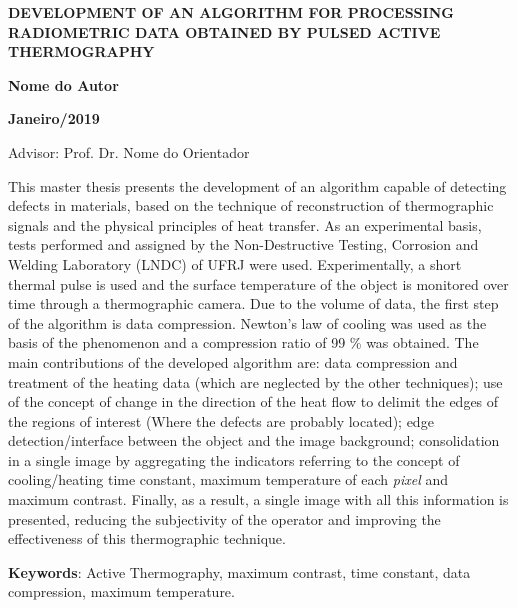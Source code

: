 \documentclass[
	    12pt,				%
	    openright,			%
	    oneside,			%
	    a4paper,			%
	english,			%
	french,				%
	spanish,			%
	brazil,				%
	]{abntex2}
\begin{document}
    \begin{center}
        \par
        \vspace*{0.2cm}
        \par
        \textbf{DEVELOPMENT OF AN ALGORITHM FOR PROCESSING RADIOMETRIC DATA OBTAINED BY PULSED ACTIVE THERMOGRAPHY}
        \par
        \vspace*{0.2cm}
        \par
        \textbf{Nome do Autor}
        \vspace*{0.2cm}
        \par
        \textbf{Janeiro/2019}
        \vspace*{0.2cm}
    \end{center}
    \par
    \noindent Advisor: Prof. Dr. Nome do Orientador
    \par
    \vspace*{0.2cm}
    \par
    This master thesis presents the development of an algorithm capable of detecting defects in materials, based on the technique of reconstruction of thermographic signals and the physical principles of heat transfer. As an experimental basis, tests performed and assigned by the Non-Destructive Testing, Corrosion and Welding Laboratory (LNDC) of UFRJ were used. Experimentally, a short thermal pulse is used and the surface temperature of the object is monitored over time through a thermographic camera. Due to the volume of data, the first step of the algorithm is data compression. Newton's law of cooling was used as the basis of the phenomenon and a compression ratio of 99 \% was obtained. The main contributions of the developed algorithm are: data compression and treatment of the heating data (which are neglected by the other techniques); use of the concept of change in the direction of the heat flow to delimit the edges of the regions of interest (Where the defects are probably located); edge detection/interface between the object and the image background; consolidation in a single image by aggregating the indicators referring to the concept of cooling/heating time constant, maximum temperature of each \emph{pixel} and maximum contrast. Finally, as a result, a single image with all this information is presented, reducing the subjectivity of the operator and improving the effectiveness of this thermographic technique.
    \par
    \noindent 
   \textbf{Keywords}: Active Thermography, maximum contrast, time constant, data compression, maximum temperature.
    \newpage
\end{document}
